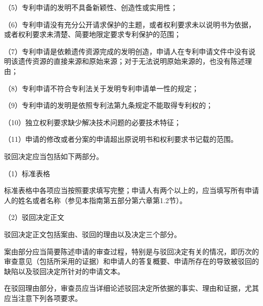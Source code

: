 {\setlength{\parindent}{17.1bp}（5）专利申请的发明不具备新颖性、创造性或实用性；\par}

{\setlength{\parindent}{17.1bp}（6）专利申请没有充分公开请求保护的主题，或者权利要求未以说明书为依据，或者权利要求未清楚、简要地限定要求专利保护的范围；\par}

{\setlength{\parindent}{17.1bp}（7）专利申请是依赖遗传资源完成的发明创造，申请人在专利申请文件中没有说明该遗传资源的直接来源和原始来源；对于无法说明原始来源的，也没有陈述理由；\par}

{\setlength{\parindent}{17.1bp}（8）专利申请不符合专利法关于发明专利申请单一性的规定；\par}

{\setlength{\parindent}{17.1bp}（9）专利申请的发明是依照专利法第九条规定不能取得专利权的；\par}

{\setlength{\parindent}{17.1bp}（10）独立权利要求缺少解决技术问题的必要技术特征；\par}

{\setlength{\parindent}{17.1bp}（11）申请的修改或者分案的申请超出原说明书和权利要求书记载的范围。\par}

驳回决定应当包括如下两部分。

{\setlength{\parindent}{17.1bp}（1）标准表格\par}

标准表格中各项应当按照要求填写完整；申请人有两个以上的，应当填写所有申请人的姓名或者名称（参见本指南第五部分第六章第1.2节）。

{\setlength{\parindent}{17.1bp}（2）驳回决定正文\par}

驳回决定正文包括案由、驳回的理由以及决定三个部分。

案由部分应当简要陈述申请的审查过程，特别是与驳回决定有关的情况，即历次的审查意见（包括所采用的证据）和申请人的答复概要、申请所存在的导致被驳回的缺陷以及驳回决定所针对的申请文本。

在驳回理由部分，审查员应当详细论述驳回决定所依据的事实、理由和证据，尤其应当注意下列各项要求。

